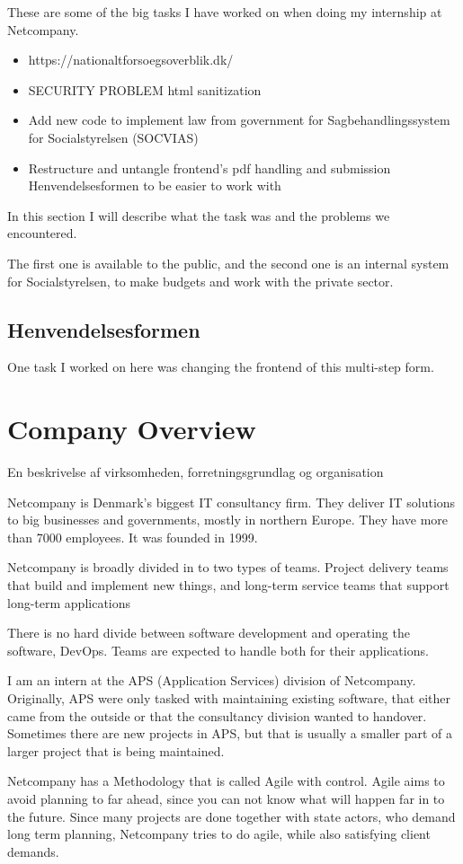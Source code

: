 \documentclass[../main.tex]{subfiles}
\begin{document}

These are some of the big tasks I have worked on when doing my internship at Netcompany.

\begin{itemize}
    \item https://nationaltforsoegsoverblik.dk/ 
    \item SECURITY PROBLEM html sanitization 
    \item Add new code to implement law from government for Sagbehandlingssystem for Socialstyrelsen (SOCVIAS) 
    \item Restructure and untangle frontend's pdf handling and submission Henvendelsesformen to be easier to work with
\end{itemize}

In this section I will describe what the task was and the problems we encountered. 


The first one is available to the public, and the second one is an internal system for Socialstyrelsen, to make budgets and work with the private sector. 

\subsection{Henvendelsesformen}
One task I worked on here was changing the frontend of this multi-step form. 



\section{Company Overview}
En beskrivelse af virksomheden, forretningsgrundlag og organisation 

Netcompany is Denmark's biggest IT consultancy firm.
They deliver IT solutions to big businesses and governments, mostly in northern Europe.
They have more than 7000 employees. It was founded in 1999. 

Netcompany is broadly divided in to two types of teams.
Project delivery teams that build and implement new things, and long-term service teams that support long-term applications

There is no hard divide between software development and operating the software, DevOps. Teams are expected to handle both for their applications. 

I am an intern at the APS (Application Services) division of Netcompany.
Originally, APS were only tasked with maintaining existing software, that either came from the outside or that the consultancy division wanted to handover.
Sometimes there are new projects in APS, but that is usually a smaller part of a larger project that is being maintained.  

Netcompany has a Methodology that is called Agile with control. Agile aims to avoid planning to far ahead, since you can not know what will happen far in to the future.
Since many projects are done together with state actors, who demand long term planning, Netcompany tries to do agile, while also satisfying client demands. 
\end{document}
